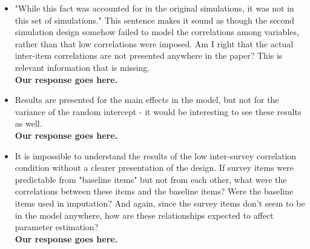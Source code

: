 \documentclass[letterpaper,12pt]{article}\usepackage[]{graphicx}\usepackage[]{color}
\begin{document}
\begin{itemize}
{\bf Our response goes here.}\\

\item "While this fact was accounted for in the original simulations, it was not in this set of simulations." This sentence makes it sound as though the second simulation design somehow failed to model the correlations among variables, rather than that low correlations were imposed. Am I right that the actual inter-item correlations are not presented anywhere in the paper? This is relevant information that is missing.\\

{\bf Our response goes here.}\\

\item Results are presented for the main effects in the model, but not for the variance of the random intercept - it would be interesting to see these results as well.\\

{\bf Our response goes here.}\\

\item It is impossible to understand the results of the low inter-survey correlation condition without a clearer presentation of the design. If survey items were predictable from "baseline items" but not from each other, what were the correlations between these items and the baseline items? Were the baseline items used in imputation? And again, since the survey items don't seem to be in the model anywhere, how are these relationships expected to affect parameter estimation?\\

{\bf Our response goes here.}\\

\end{itemize}





\end{document}

